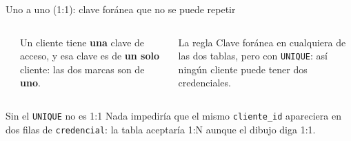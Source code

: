 \documentclass[aspectratio=169,10pt,c]{beamer}
\begin{document}
\begin{frame}{Uno a uno (1:1): clave foránea que no se puede repetir}
\begin{columns}[c,onlytextwidth]
\begin{center}
\end{center}
\small Un cliente tiene \textbf{una} clave de acceso, y esa clave es de \textbf{un solo} cliente: las dos marcas son de \textbf{uno}.\\[6pt]
\begin{block}{La regla}
\small Clave foránea en cualquiera de las dos tablas, pero con \texttt{UNIQUE}: así ningún cliente puede tener dos credenciales.
\end{block}
\end{columns}
\vspace{0.2cm}
\begin{alertblock}{Sin el \texttt{UNIQUE} no es 1:1}
\small Nada impediría que el mismo \texttt{cliente\_id} apareciera en dos filas de \texttt{credencial}: la tabla aceptaría 1:N aunque el dibujo diga 1:1.
\end{alertblock}
\end{frame}
\end{document}
